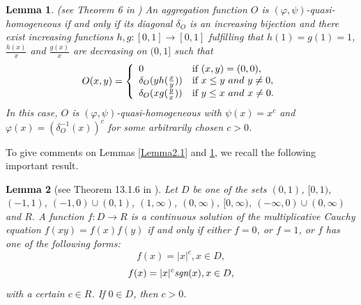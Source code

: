 \documentclass[12pt]{article}
\newtheorem{lemma}{\bf Lemma}[section]
\begin{document}
\begin{lemma}\label{Lemma2.2}(see Theorem 6 in \cite{Su2022})
An aggregation function $O$ is $(\varphi, \psi)$-quasi-homogeneous if and only if its diagonal $\delta_O$ is an increasing bijection and there exist increasing functions $h, g:[0, 1] \rightarrow[0, 1]$ fulfilling that $h(1)=g(1)=1$, $\frac {h(x)}{x}$ and $\frac {g(x)}{x}$ are decreasing on $(0, 1]$ such that
\begin{equation*}
O(x,y)=\left\{\begin{array}{ll}
0 & {\mbox{\scriptsize\normalsize if  } (x,y)=(0,0)},\\
\delta_O(yh(\frac{x}{y})) & {\mbox{\scriptsize\normalsize if  } x\leq y \ and\  y\neq0},\\
\delta_O(xg(\frac{y}{x})) & {\mbox{\scriptsize\normalsize if  } y\leq x \ and\ x\neq0}.
\end{array}
\right.
\end{equation*}
In this case, $O$ is $(\varphi, \psi)$-quasi-homogeneous with $\psi(x)=x^c$ and $\varphi(x)=(\delta_O^{-1}(x))^c$ for some arbitrarily chosen $c>0$.
\end{lemma}

To give comments on Lemmas \ref{Lemma2.1} and \ref{Lemma2.2}, we recall the following important result.
\begin{lemma}[see Theorem 13.1.6 in \cite{Kuczma1985}]\label{lem2.1}
Let $D$ be one of the sets $(0, 1)$, $[0, 1)$, $(-1, 1)$, $(-1, 0)\cup (0, 1)$, $(1, \infty)$, $(0, \infty)$, $[0, \infty)$, $(-\infty, 0)\cup (0, \infty)$ and $R$. A function $f:D\rightarrow R$ is a continuous solution of the multiplicative Cauchy equation $f(xy) = f(x)f(y)$ if and only if either $f=0$, or $f=1$, or $f$ has one of the following forms:
$$f(x)= |x|^c, x\in D,$$
$$f (x) = |x|^c \emph{sgn}(x), x\in D,$$
with a certain $c\in R$. If $0\in D$, then $c>0$.
\end{lemma}
\end{document}
